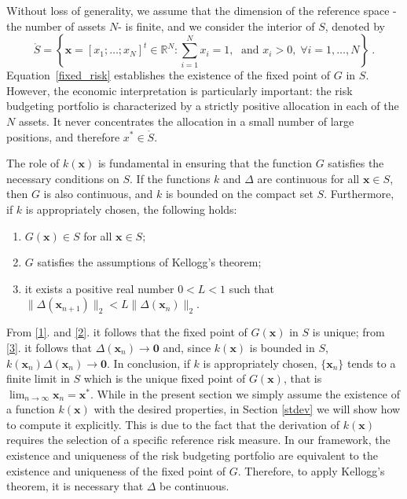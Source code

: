 \documentclass[preprint,11pt,authoryear]{elsarticle}
\begin{document}
Without loss of generality, we assume that the dimension of the reference space -the number of assets $N$- is finite, and we consider the interior of $S$, denoted by
$$\mathring{S} = \left\{\mathbf{x} = [x_1;\ldots;x_N]^t \in \mathbb R^N : \sum_{i=1}^{N} x_i=1, \; \textrm{ and } x_i > 0, \; \forall i =1,\ldots,N \right\}\ . $$
Equation~\eqref{fixed_risk} establishes the existence of the fixed point of $G$ in $S$. However, the economic interpretation is particularly important: the risk budgeting portfolio is characterized by a strictly positive allocation in each of the $N$ assets. It never concentrates the allocation in a small number of large positions, and therefore $x^* \in \mathring{S}$.

The role of $k(\mathbf{x})$ is fundamental in ensuring that the function $G$ satisfies the necessary conditions on $S$. If the functions $k$ and $\Delta$ are continuous for all $\mathbf x \in S$, then $G$ is also continuous, and $k$ is bounded on the compact set $S$. Furthermore, if $k$ is appropriately chosen, the following holds:
\begin{enumerate}
 \item $G(\mathbf{x}) \in S$ for all $\mathbf x \in S$;  \label{1}
 \item $G$ satisfies the assumptions of Kellogg's theorem; \label{2}
 \item it exists a positive real number $0<L<1$ such that $\|\Delta(\mathbf{x}_{n+1})\|_2 < L\|\Delta(\mathbf{x}_n)\|_2$.\label{3}  \end{enumerate}
From \ref{1}. and \ref{2}. it follows that the fixed point of $G(\mathbf{x})$ in $S$ is unique; from \ref{3}. it follows that $\Delta(\mathbf{x}_n) \rightarrow \mathbf{0}$ and, since $k(\mathbf{x})$ is bounded in $S$, $k(\mathbf{x}_n) \Delta(\mathbf{x}_n) \rightarrow \mathbf{0} $. In conclusion, if $k$ is appropriately chosen, $\{\mathbf{x}_n\}$ tends to a finite limit in $S$ which is the unique fixed point of $G(\mathbf{x})$, that is $\lim_{n\rightarrow \infty} \mathbf x_n= \mathbf x^*$. While in the present section we simply assume the existence of a function $k(\mathbf{x})$ with the desired properties, in Section \ref{stdev} we will show how to compute it explicitly. This is due to the fact that the derivation of $k(\mathbf{x})$ requires the selection of a specific reference risk measure. In our framework, the existence and uniqueness of the risk budgeting portfolio are equivalent to the existence and uniqueness of the fixed point of $G$. Therefore, to apply Kellogg’s theorem, it is necessary that $\Delta$ be continuous.
\end{document}

